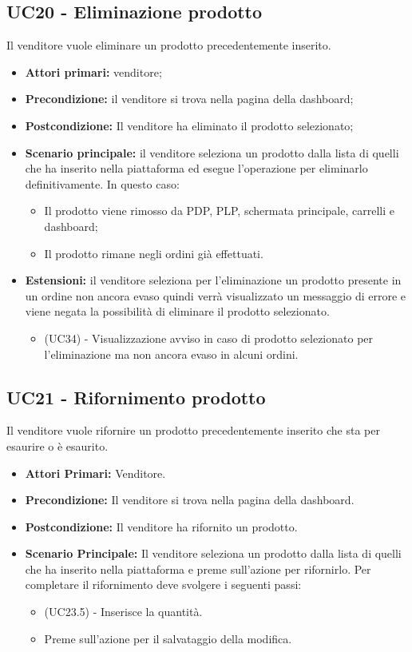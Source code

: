 \subsection{UC20 - Eliminazione prodotto}
\label{UC20}

Il venditore vuole eliminare un prodotto precedentemente inserito.
\begin{itemize}
    \item \textbf{Attori primari:} venditore;
    \item \textbf{Precondizione:} il venditore si trova nella pagina della dashboard;
    \item \textbf{Postcondizione:} Il venditore ha eliminato il prodotto selezionato;
    \item \textbf{Scenario principale:} il venditore seleziona un prodotto dalla lista di quelli che ha inserito nella piattaforma ed esegue l'operazione per eliminarlo definitivamente. In questo caso:
    \begin{itemize}
    \item Il prodotto viene rimosso da PDP, PLP, schermata principale, carrelli e dashboard;
    \item Il prodotto rimane negli ordini già effettuati.
    \end{itemize}
    \item \textbf{Estensioni:} il venditore seleziona per l'eliminazione un prodotto presente in un ordine non ancora evaso quindi verrà visualizzato un messaggio di errore e viene negata la possibilità di eliminare il prodotto selezionato.
    \begin{itemize}
        \item (UC34) - Visualizzazione avviso in caso di prodotto selezionato per l’eliminazione ma non ancora evaso in alcuni ordini.
    \end{itemize}
\end{itemize}

\subsection{UC21 - Rifornimento prodotto}
\label{UC21}
Il venditore vuole rifornire un prodotto precedentemente inserito che sta per esaurire o è esaurito.
\begin{itemize}
    \item \textbf{Attori Primari:} Venditore.
    \item \textbf{Precondizione:} Il venditore si trova nella pagina della dashboard.
    \item \textbf{Postcondizione:} Il venditore ha rifornito un prodotto.
    \item \textbf{Scenario Principale:} Il venditore seleziona un prodotto dalla lista di quelli che ha inserito nella piattaforma e preme sull'azione per rifornirlo. Per completare il rifornimento deve svolgere i seguenti passi:
    \begin{itemize}
        \item (UC23.5) - Inserisce la quantità.
        \item Preme sull'azione per il salvataggio della modifica.
    \end{itemize}
\end{itemize}

